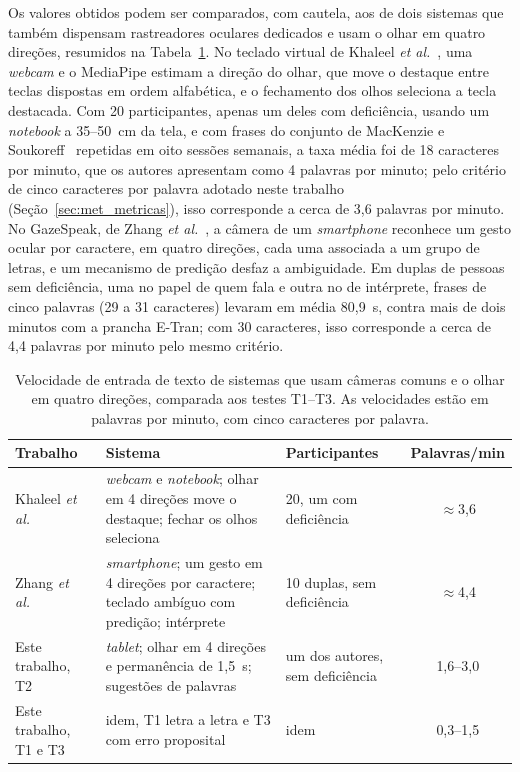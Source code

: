 Os valores obtidos podem ser comparados, com cautela, aos de dois sistemas que também dispensam rastreadores oculares dedicados e usam o olhar em quatro direções, resumidos na Tabela~\ref{tab:comparacao_trabalhos}. No teclado virtual de Khaleel \textit{et al.}~\cite{khaleel2025}, uma \textit{webcam} e o MediaPipe estimam a direção do olhar, que move o destaque entre teclas dispostas em ordem alfabética, e o fechamento dos olhos seleciona a tecla destacada. Com 20 participantes, apenas um deles com deficiência, usando um \textit{notebook} a 35--50~cm da tela, e com frases do conjunto de MacKenzie e Soukoreff~\cite{mackenzie2003phrase} repetidas em oito sessões semanais, a taxa média foi de 18 caracteres por minuto, que os autores apresentam como 4 palavras por minuto; pelo critério de cinco caracteres por palavra adotado neste trabalho (Seção~\ref{sec:met_metricas}), isso corresponde a cerca de 3,6 palavras por minuto. No GazeSpeak, de Zhang \textit{et al.}~\cite{zhang2017gazespeak}, a câmera de um \textit{smartphone} reconhece um gesto ocular por caractere, em quatro direções, cada uma associada a um grupo de letras, e um mecanismo de predição desfaz a ambiguidade. Em duplas de pessoas sem deficiência, uma no papel de quem fala e outra no de intérprete, frases de cinco palavras (29 a 31 caracteres) levaram em média 80,9~s, contra mais de dois minutos com a prancha E-Tran; com 30 caracteres, isso corresponde a cerca de 4,4 palavras por minuto pelo mesmo critério.

\begin{table}[htbp]
    \centering
    \caption{Velocidade de entrada de texto de sistemas que usam câmeras comuns e o olhar em quatro direções, comparada aos testes T1--T3. As velocidades estão em palavras por minuto, com cinco caracteres por palavra.}
    \label{tab:comparacao_trabalhos}
    \begin{tabular}{p{3.2cm}p{5.4cm}p{3.0cm}c}
        \hline
        Trabalho & Sistema & Participantes & Palavras/min \\
        \hline
        \raggedright Khaleel \textit{et al.}~\cite{khaleel2025} & \raggedright \textit{webcam} e \textit{notebook}; olhar em 4 direções move o destaque; fechar os olhos seleciona & \raggedright 20, um com deficiência & $\approx$3,6 \\
        \raggedright Zhang \textit{et al.}~\cite{zhang2017gazespeak} & \raggedright \textit{smartphone}; um gesto em 4 direções por caractere; teclado ambíguo com predição; intérprete & \raggedright 10 duplas, sem deficiência & $\approx$4,4 \\
        \raggedright Este trabalho, T2 & \raggedright \textit{tablet}; olhar em 4 direções e permanência de 1,5~s; sugestões de palavras & \raggedright um dos autores, sem deficiência & 1,6--3,0 \\
        \raggedright Este trabalho, T1 e T3 & \raggedright idem, T1 letra a letra e T3 com erro proposital & \raggedright idem & 0,3--1,5 \\
        \hline
    \end{tabular}
\end{table}

